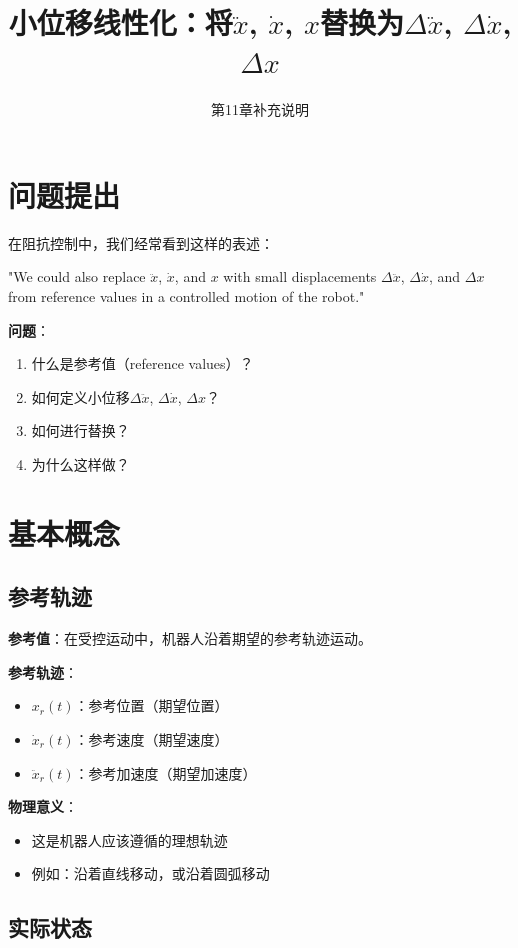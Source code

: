 \documentclass[12pt,a4paper]{article}
\title{小位移线性化：将$\ddot{x}$, $\dot{x}$, $x$替换为$\Delta \ddot{x}$, $\Delta \dot{x}$, $\Delta x$}
\author{第11章补充说明}
\date{}
\begin{document}
\maketitle

\section{问题提出}

在阻抗控制中，我们经常看到这样的表述：

"We could also replace $\ddot{x}$, $\dot{x}$, and $x$ with small displacements $\Delta \ddot{x}$, $\Delta \dot{x}$, and $\Delta x$ from reference values in a controlled motion of the robot."

\textbf{问题}：
\begin{enumerate}
\item 什么是参考值（reference values）？
\item 如何定义小位移$\Delta \ddot{x}$, $\Delta \dot{x}$, $\Delta x$？
\item 如何进行替换？
\item 为什么这样做？
\end{enumerate}

\section{基本概念}

\subsection{参考轨迹}

\textbf{参考值}：在受控运动中，机器人沿着期望的参考轨迹运动。

\textbf{参考轨迹}：
\begin{itemize}
\item $x_r(t)$：参考位置（期望位置）
\item $\dot{x}_r(t)$：参考速度（期望速度）
\item $\ddot{x}_r(t)$：参考加速度（期望加速度）
\end{itemize}

\textbf{物理意义}：
\begin{itemize}
\item 这是机器人应该遵循的理想轨迹
\item 例如：沿着直线移动，或沿着圆弧移动
\end{itemize}

\subsection{实际状态}
\end{document}
